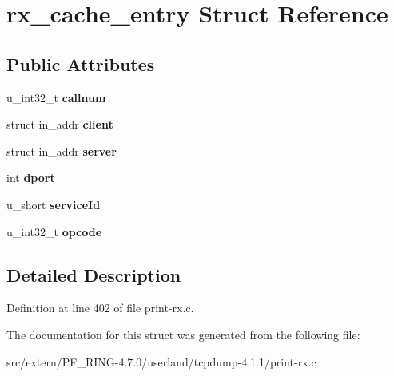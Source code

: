 \hypertarget{structrx__cache__entry}{
\section{rx\_\-cache\_\-entry Struct Reference}
\label{structrx__cache__entry}
}
\subsection*{Public Attributes}
\begin{DoxyCompactItemize}
\item 
\hypertarget{structrx__cache__entry_a0707cd5e1d586bc49b1b4424adbf860e}{
u\_\-int32\_\-t {\bfseries callnum}}
\label{structrx__cache__entry_a0707cd5e1d586bc49b1b4424adbf860e}

\item 
\hypertarget{structrx__cache__entry_a350c0801745cc1562683adecf7edde46}{
struct in\_\-addr {\bfseries client}}
\label{structrx__cache__entry_a350c0801745cc1562683adecf7edde46}

\item 
\hypertarget{structrx__cache__entry_a1b6d98569797d39589928c87cd4d02af}{
struct in\_\-addr {\bfseries server}}
\label{structrx__cache__entry_a1b6d98569797d39589928c87cd4d02af}

\item 
\hypertarget{structrx__cache__entry_a9caf043caa8dded92db82ad1e0da6cf0}{
int {\bfseries dport}}
\label{structrx__cache__entry_a9caf043caa8dded92db82ad1e0da6cf0}

\item 
\hypertarget{structrx__cache__entry_ad770e2847e9e6a64c6638d9dc0653cd4}{
u\_\-short {\bfseries serviceId}}
\label{structrx__cache__entry_ad770e2847e9e6a64c6638d9dc0653cd4}

\item 
\hypertarget{structrx__cache__entry_aed2c6df7e0672598731a83f509fb58c1}{
u\_\-int32\_\-t {\bfseries opcode}}
\label{structrx__cache__entry_aed2c6df7e0672598731a83f509fb58c1}

\end{DoxyCompactItemize}


\subsection{Detailed Description}


Definition at line 402 of file print-\/rx.c.



The documentation for this struct was generated from the following file:\begin{DoxyCompactItemize}
\item 
src/extern/PF\_\-RING-\/4.7.0/userland/tcpdump-\/4.1.1/print-\/rx.c\end{DoxyCompactItemize}
